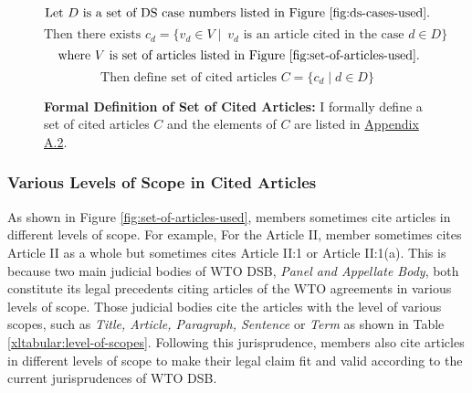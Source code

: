 \begin{figure}[ht]
   \[\text{Let } D \text{ is a set of DS case numbers listed in Figure \ref{fig:ds-cases-used}.} \] %
   \[\text{Then there exists } c_d = \{v_d \in V \mid\ v_d \text{ is an article cited in the case } d \in D\} \]
   \[\text{ where } V \text{ is set of articles listed in Figure \ref{fig:set-of-articles-used}}.\]
   \[\text{Then define set of cited articles } C = \{c_d \mid d \in D\}\]
   \caption{\textbf{Formal Definition of Set of Cited Articles: }I formally define a set of cited articles $C$ and the elements of $C$ are listed in \hyperref[sub:cited-articles-table]{Appendix A.2}.}
   \label{fig:def:set-of-cited-articles}
\end{figure}
 
 
\subsubsection{Various Levels of Scope in Cited Articles}
As shown in Figure \ref{fig:set-of-articles-used},
members sometimes
cite articles in different levels of scope. For example,
For the Article II, member sometimes cites
Article II as a whole but sometimes cites
Article II:1 or Article II:1(a).
This is because two main judicial bodies of WTO DSB, \textit{Panel and Appellate Body},
both constitute its legal precedents citing articles of the WTO agreements in
various levels of scope.
Those judicial bodies cite the articles with the level of various scopes, such as \textit{Title, Article, Paragraph, Sentence} or \textit{Term} as shown in Table {\ref{xltabular:level-of-scopes}}.
Following this jurisprudence, members also cite articles in different levels of scope to
make their legal claim fit and valid according to the current jurisprudences of WTO DSB.\\ %
 
 

